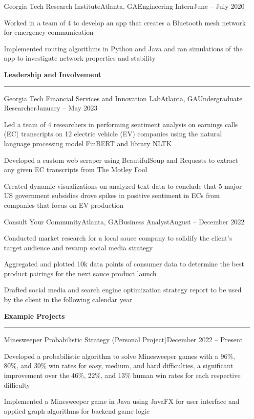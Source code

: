 \documentclass{article}
\newcommand{\horizontal}{\vspace{2pt}\hrule}
\newcommand{\sectitle}[1]{\vspace{2pt} \textbf{\large #1} \horizontal}
\begin{document}
\begin{flushleft}
    \begin{experience}{Georgia Tech Research Institute}{Atlanta, GA}{Engineering Intern}{June -- July 2020}
        \item Worked in a team of 4 to develop an app that creates a Bluetooth mesh network for emergency communication
        \item Implemented routing algorithms in Python and Java and ran simulations of the app to investigate network properties and stability
    \end{experience}


\sectitle{Leadership and Involvement}

    \begin{experience}{Georgia Tech Financial Services and Innovation Lab}{Atlanta, GA}{Undergraduate Researcher}{January -- May 2023}
        \item Led a team of 4 researchers in performing sentiment analysis on earnings calls (EC) transcripts on 12 electric vehicle (EV) companies using the natural language processing model FinBERT and library NLTK
        \item Developed a custom web scraper using BeautifulSoup and Requests to extract any given EC transcripts from The Motley Fool
        \item Created dynamic visualizations on analyzed text data to conclude that 5 major US government subsidies drove spikes in positive sentiment in ECs from companies that focus on EV production
    \end{experience}

    \begin{experience}{Consult Your Community}{Atlanta, GA}{Business Analyst}{August -- December 2022}
        \item Conducted market research for a local sauce company to solidify the client's target audience and revamp social media strategy
        \item Aggregated and plotted 10k data points of consumer data to determine the best product pairings for the next sauce product launch
        \item Drafted social media and search engine optimization strategy report to be used by the client in the following calendar year
    \end{experience}
\sectitle{Example Projects}

    \vspace{3pt}

    \begin{subexperience}{Minesweeper Probabilistic Strategy (Personal Project)}{December 2022 -- Present}
        \item Developed a probabilistic algorithm to solve Minesweeper games with a 96\%, 80\%, and 30\% win rates for easy, medium, and hard difficulties, a significant improvement over the 46\%, 22\%, and 13\% human win rates for each respective difficulty
        \item Implemented a Minesweeper game in Java using JavaFX for user interface and applied graph algorithms for backend game logic
    \end{subexperience}


\end{flushleft}
\end{document}
